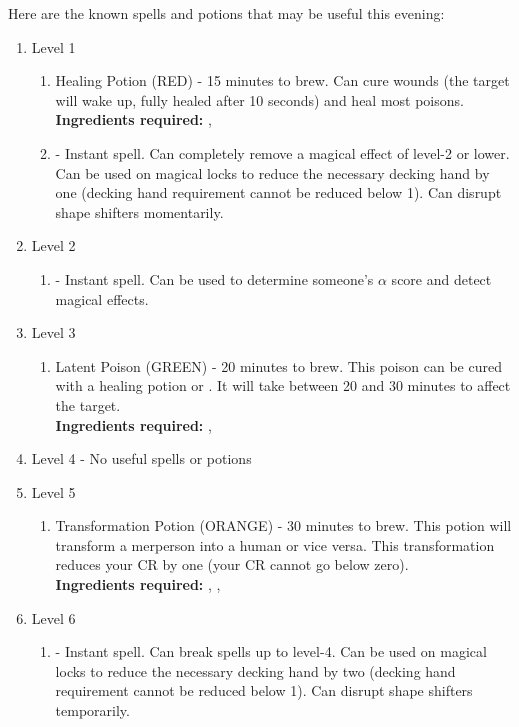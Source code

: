 \documentclass[green]{NeptuneBall}
\begin{document}
Here are the known spells and potions that may be useful this evening: %
\begin{enumerate}
  \item Level 1
   \begin{enumerate}
     \item Healing Potion (RED) - 15 minutes to brew. Can cure wounds (the target will wake up, fully healed after 10 seconds) and heal most poisons.\\ 
     {\bf Ingredients required:} \iSeaSnake{}, \iSeaFan{}
     \item \aLesserDispel{} - Instant spell. Can completely remove a magical effect of level-2 or lower. Can be used on magical locks to reduce the necessary decking hand by one (decking hand requirement cannot be reduced below 1). Can disrupt shape shifters momentarily.
   \end{enumerate}
  \item Level 2
   \begin{enumerate}
     \item \aPerceive{} - Instant spell. Can be used to determine someone's $\alpha$ score and detect magical effects.
   \end{enumerate}
  \item Level 3
     \begin{enumerate}
     \item Latent Poison (GREEN) - 20 minutes to brew. This poison can be cured with a healing potion or \aFirstAid{}. It will take between 20 and 30 minutes to affect the target.\\
     {\bf Ingredients required:} \iSeaUrchins{}, \iAnglerFish{}
   \end{enumerate}
   \item Level 4 - No useful spells or potions
   \item Level 5
    \begin{enumerate}
     \item Transformation Potion (ORANGE) - 30 minutes to brew. This potion will transform a merperson into a human or vice versa. This transformation reduces your CR by one (your CR cannot go below zero).\\
      {\bf Ingredients required:} \iSquid{}, \iSponge{}, \iBarnacle{}
   \end{enumerate}
   \item Level 6
    \begin{enumerate}
      \item \aGreaterDispel{} - Instant spell. Can break spells up to level-4. Can be used on magical locks to reduce the necessary decking hand by two (decking hand requirement cannot be reduced below 1). Can disrupt shape shifters temporarily.

\end{enumerate}
\end{enumerate}
\end{document}
